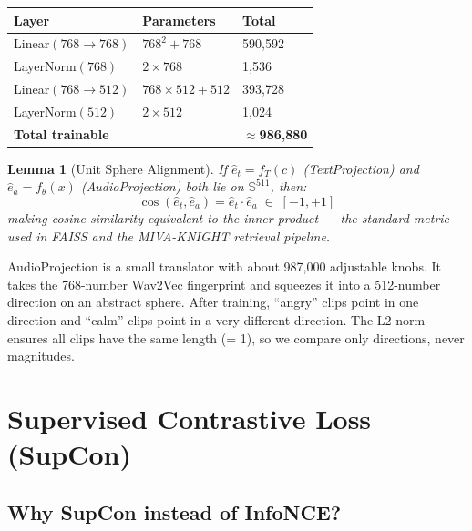 \documentclass[12pt,a4paper]{article}
\theoremstyle{definition}
\theoremstyle{plain}
\newtheorem{lemma}{Lemma}[section]
\theoremstyle{remark}
\begin{document}
\begin{center}
\renewcommand{\arraystretch}{1.15}
\begin{tabular}{@{}lll@{}}
\toprule
\textbf{Layer} & \textbf{Parameters} & \textbf{Total} \\
\midrule
Linear$(768\to768)$ & $768^2 + 768$ & 590,592 \\
LayerNorm$(768)$ & $2\times768$ & 1,536 \\
Linear$(768\to512)$ & $768\times512+512$ & 393,728 \\
LayerNorm$(512)$ & $2\times512$ & 1,024 \\
\midrule
\textbf{Total trainable} & & $\approx$\textbf{986,880} \\
\bottomrule
\end{tabular}
\end{center}

\begin{lemma}[Unit Sphere Alignment]
\label{lem:alignment}
If $\hat{e}_t = f_T(c)$ (TextProjection) and $\hat{e}_a = f_\theta(x)$
(AudioProjection) both lie on $\mathbb{S}^{511}$, then:
\[
  \cos(\hat{e}_t, \hat{e}_a) = \hat{e}_t \cdot \hat{e}_a \;\in\; [-1,+1]
\]
making cosine similarity equivalent to the inner product --- the standard
metric used in FAISS and the MIVA-KNIGHT retrieval pipeline.
\end{lemma}

\begin{tcolorbox}[layman]
AudioProjection is a small translator with about 987,000 adjustable knobs.
It takes the 768-number Wav2Vec fingerprint and squeezes it into a 512-number
direction on an abstract sphere.  After training, ``angry'' clips point in one
direction and ``calm'' clips point in a very different direction.
The L2-norm ensures all clips have the same length (= 1), so we compare only
directions, never magnitudes.
\end{tcolorbox}

\section{Supervised Contrastive Loss (SupCon)}

\subsection{Why SupCon instead of InfoNCE?}
\end{document}
